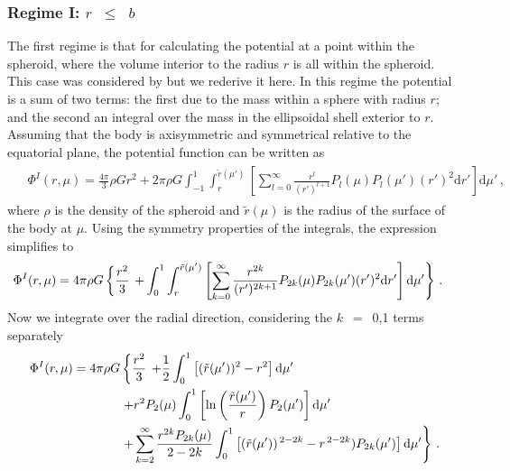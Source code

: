 \documentclass[11pt, oneside]{article}   	%
\begin{document}
\subsubsection{Regime I: $r$~$\leq$~$b$}
\label{HUG:sec:R1}

The first regime is that for calculating the potential at a point within the spheroid, where the volume interior to the radius $r$ is all within the spheroid. 
This case was considered by \cite{Hubbard2013} but we rederive it here.
In this regime the potential is a sum of two terms: the first due to the mass within a sphere with radius $r$; and the second an integral over the mass in the ellipsoidal shell exterior to $r$.
Assuming that the body is axisymmetric and symmetrical relative to the equatorial plane, the potential function can be written as
%
\begin{align}
\begin{aligned}
{} & \Phi^I(r,\mu)= \frac{4\pi}{3} \rho G r^2 
 + 2\pi \rho G \int_{-1}^{1} \int_{r}^{\tilde{r} (\mu')} \left [ \sum_{l=0}^{\infty} \frac{r^{l}}{(r')^{l+1}} P_{l}(\mu)P_{l}(\mu') (r')^2 \mathrm{d}r' \right ] \mathrm{d}\mu' \,,
\end{aligned}
\end{align}
%
where $\rho$ is the density of the spheroid and $\tilde{r}(\mu)$ is the radius of the surface of the body at $\mu$.
Using the symmetry properties of the integrals, the expression simplifies to
%
\begin{align}
\begin{aligned}
{} & \Phi^I(r,\mu)=  4\pi \rho G \left \{ \frac{r^2}{3} \right. 
 \left. + \int_{0}^{1} \int_{r}^{\tilde{r}(\mu')} \left [ \sum_{k=0}^{\infty} \frac{r^{2k}}{(r')^{2k+1}} P_{2k}(\mu)P_{2k}(\mu') (r')^2 {\rm d}r' \right ] {\rm d}\mu' \right \} \,.
\end{aligned}
\end{align}
%
Now we integrate over the radial direction, considering the $k$~$=$~0,1 terms separately
%
\begin{align}
\begin{aligned}
 \Phi^I(r,\mu) =    4\pi \rho G  {} & \left \{ \frac{r^2}{3} \right .  \left . + \frac{1}{2} \int_{0}^{1} \left [ (\tilde{r}(\mu'))^2 - r^2 \right ] {\rm d}\mu' \right . \\
& \left. + r^2 P_{2}(\mu)  \int_{0}^{1} \left [ \ln \left ( \frac{\tilde{r}(\mu')}{r}\right ) P_{2}(\mu') \right ] {\rm d}\mu' \right . \\
& \left. + \sum_{k=2}^{\infty} \frac{r^{2k} P_{2k}(\mu)}{2-2k}  \int_{0}^{1} \left [ (\tilde{r}(\mu'))^{\, 2-2k} - r^{\, 2-2k} ) P_{2k}(\mu')  \right ] {\rm d}\mu'  \right \} \,.
\end{aligned}
\end{align}
\end{document}

